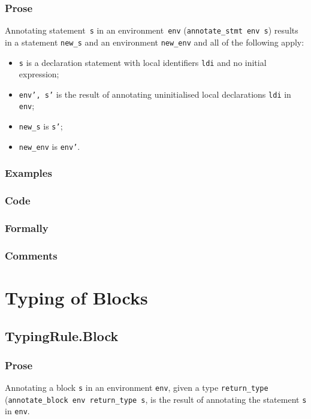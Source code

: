 \documentclass{book}
\begin{document}
  \subsection{Prose}
Annotating statement~\texttt{s} in an environment~\texttt{env}
(\texttt{annotate\_stmt env s}) results in a statement \texttt{new\_s} and an
environment \texttt{new\_env} and all of the following apply:
   \begin{itemize}
   \item \texttt{s} is a declaration statement with local identifiers \texttt{ldi} and no initial expression;
   \item \texttt{env', s'} is the result of annotating uninitialised local declarations \texttt{ldi} in \texttt{env};
   \item \texttt{new\_s} is \texttt{s'};
   \item \texttt{new\_env} is \texttt{env'}.
   \end{itemize}

  \subsection{Examples}

  \subsection{Code}

  \subsection{Formally}

  \subsection{Comments}

\chapter{Typing of Blocks}

\section{TypingRule.Block \label{sec:TypingRule.Block}}
    
  \subsection{Prose}
    Annotating a block \texttt{s} in an environment \texttt{env}, given a type
\texttt{return\_type} (\texttt{annotate\_block env return\_type s}, is the
result of annotating the statement \texttt{s} in \texttt{env}.
   
\end{document}
